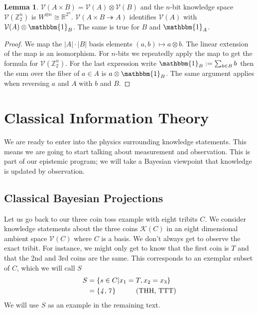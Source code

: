 \documentclass[12pt,a4paper]{article}
\theoremstyle{myrule}
\theoremstyle{postulate}
\theoremstyle{definition}
\newtheorem{lemma}[theorem]{Lemma}
\begin{document}
\begin{lemma}
\label{product}
  $\mathcal{V}(A \times B) = \mathcal{V}(A) \otimes \mathcal{V}(B)$ and the $n$-bit knowledge space $\mathcal{V}(\mathbb{Z}_2^n)$ is $W ^ {\otimes n} \cong \mathbb{R}^{2^n}$.  $\mathcal{V}(A \times B \twoheadrightarrow A)$ identifies $\mathcal{V}(A)$ with $\mathcal{V}(A) \otimes \mathbbm{1}_B$.  The same is true for $B$ and $\mathbbm{1}_A$.
\end{lemma}
\begin{proof}
  We map the $|A|\cdot|B|$ basis elements $(a,b) \mapsto a \otimes b$.  The linear extension of the map is an isomorphism.  For $n$-bits we repeatedly apply the map to get the formula for $\mathcal{V}(\mathbb{Z}_2^n)$.  For the last expression write $\mathbbm{1}_B := \sum_{b \in B} b$ then the sum over the fiber of $a \in A$ is $a \otimes \mathbbm{1}_B$.  The same argument applies when reversing $a$ and $A$ with $b$ and $B$.
\end{proof}

\section{Classical Information Theory}
\label{physicsstart}
We are ready to enter into the physics surrounding knowledge statements.  This means we are going to start talking about measurement and observation.  This is part of our epistemic program;  we will take a Bayesian viewpoint that knowledge is updated by observation.

\subsection{Classical Bayesian Projections}
\label{proj}
Let us go back to our three coin toss example with eight tribits $C$.   We consider knowledge statements about the three coins $\mathcal{K}(C)$ in an eight dimensional ambient space $\mathcal{V}(C)$ where $C$ is a basis.  We don't always get to observe the exact tribit.  For instance, we might only get to know that the first coin is $T$ and that the 2nd and 3rd coins are the same.  This corresponds to an exemplar subset of $C$, which we will call $S$
\[
\begin{split}
  S &= \{s \in C | x_1 = T, x_2 = x_3 \} \\
    & = \{\mathit{4},\mathit{7}\} \hspace{0.4 in} \text{(THH, TTT)}
\end{split}
\]
We will use $S$ as an example in the remaining text.
\end{document}
